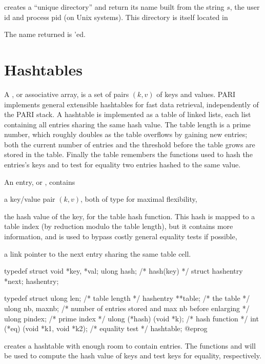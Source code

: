  creates a ``unique directory''
and return its name built from the string $s$, the user id and process pid
(on Unix systems). This directory is itself located in

The name returned is 'ed.


\section{Hashtables}
A , or associative array, is a set of pairs $(k,v)$ of keys
and values. PARI implements general extensible hashtables for fast data
retrieval, independently of the PARI stack. A hashtable is implemented as a
table of linked lists, each list containing all entries sharing the same hash
value. The table length is a prime number, which roughly doubles as the table
overflows by gaining new entries; both the current number of entries and the
threshold before the table grows are stored in the table. Finally the table
remembers the functions used to hash the entries's keys and to test for
equality two entries hashed to the same value.

An entry, or , contains

\item a key/value pair $(k,v)$, both of type  for maximal
flexibility,

\item the hash value of the key, for the table hash function. This hash is
mapped to a table index (by reduction modulo the table length), but it
contains more information, and is used to bypass costly general equality
tests if possible,

\item a link pointer to the next entry sharing the same table cell.

\bprog
typedef struct {
  void *key, *val;
  ulong hash; /* hash(key) */
  struct hashentry *next;
} hashentry;

typedef struct {
  ulong len; /* table length */
  hashentry **table; /* the table */
  ulong nb, maxnb; /* number of entries stored and max nb before enlarging */
  ulong pindex; /* prime index */
  ulong (*hash) (void *k); /* hash function */
  int (*eq) (void *k1, void *k2); /* equality test */
} hashtable;
@eprog\noindent

\hfil\break
creates a hashtable with enough room to contain  entries.
The functions  and  will be used to compute the hash value
of keys and test keys for equality, respectively.

